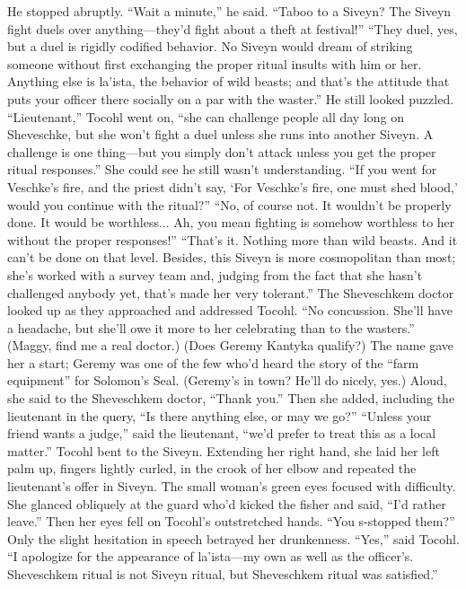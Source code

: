 \documentclass[9pt]{article}
\begin{document}
He stopped abruptly. “Wait a minute,” he said. “Taboo to a Siveyn? The Siveyn fight duels over
anything—they’d fight about a theft at festival!”
“They duel, yes, but a duel is rigidly codified behavior. No Siveyn would dream of striking someone
without first exchanging the proper ritual insults with him or her. Anything else is la’ista, the behavior of
wild beasts; and that’s the attitude that puts your officer there socially on a par with the waster.”
He still looked puzzled. “Lieutenant,” Tocohl went on, “she can challenge people all day long on
Sheveschke, but she won’t fight a duel unless she runs into another Siveyn. A challenge is one thing—but
you simply don’t attack unless you get the proper ritual responses.”
She could see he still wasn’t understanding. “If you went for Veschke’s fire, and the priest didn’t say,
‘For Veschke’s fire, one must shed blood,’ would you continue with the ritual?”
“No, of course not. It wouldn’t be properly done. It would be worthless... Ah, you mean fighting is
somehow worthless to her without the proper responses!”
“That’s it. Nothing more than wild beasts. And it can’t be done on that level. Besides, this Siveyn is
more cosmopolitan than most; she’s worked with a survey team and, judging from the fact that she hasn’t
challenged anybody yet, that’s made her very tolerant.”
The Sheveschkem doctor looked up as they approached and addressed Tocohl. “No concussion.
She’ll have a headache, but she’ll owe it more to her celebrating than to the wasters.”
(Maggy, find me a real doctor.)
(Does Geremy Kantyka qualify?)
The name gave her a start; Geremy was one of the few who’d heard the story of the “farm
equipment” for Solomon’s Seal. (Geremy’s in town? He’ll do nicely, yes.) Aloud, she said to the
Sheveschkem doctor, “Thank you.” Then she added, including the lieutenant in the query, “Is there
anything else, or may we go?”
“Unless your friend wants a judge,” said the lieutenant, “we’d prefer to treat this as a local matter.”
Tocohl bent to the Siveyn. Extending her right hand, she laid her left palm up, fingers lightly curled, in
the crook of her elbow and repeated the lieutenant’s offer in Siveyn.
The small woman’s green eyes focused with difficulty. She glanced obliquely at the guard who’d
kicked the fisher and said, “I’d rather leave.” Then her eyes fell on Tocohl’s outstretched hands. “You
s-stopped them?” Only the slight hesitation in speech betrayed her drunkenness.
“Yes,” said Tocohl. “I apologize for the appearance of la’ista—my own as well as the officer’s.
Sheveschkem ritual is not Siveyn ritual, but Sheveschkem ritual was satisfied.”
\end{document}
